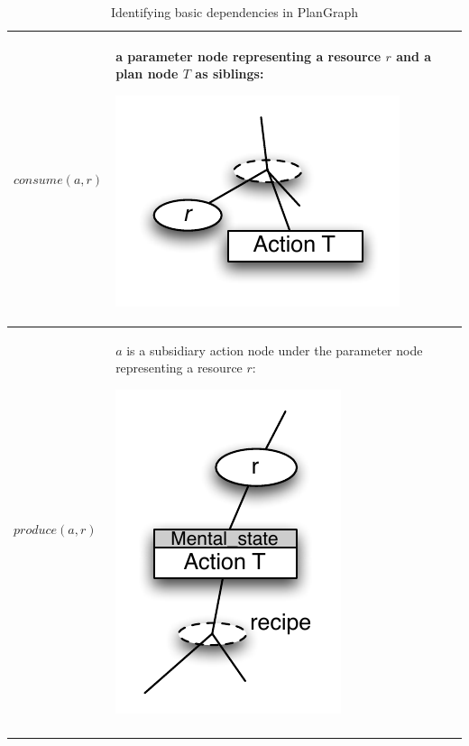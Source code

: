 \begin{center}
\begin{longtable}{|p{4.5cm}|p{8.5cm}|}
\hline
$consume(a, r)$ & a parameter node representing a resource $r$ and  a plan node $T$ as siblings: \par \includegraphics[scale=0.6]{use.pdf}\\
\hline
$produce(a, r)$ &  $a$ is a subsidiary action node under the parameter node representing a resource $r$: \par \includegraphics[scale=0.6]{generate.pdf}\\
\hline
\caption{Identifying basic dependencies in PlanGraph}
\label{tab:basic_deps_pg}
\end{longtable}
\end{center}







 

